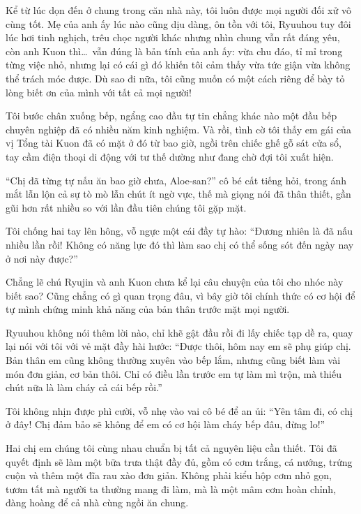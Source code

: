 \documentclass[../main.tex]{subfiles}
\begin{document}
Kể từ lúc dọn đến ở chung trong căn nhà này, tôi luôn được mọi người đối xử vô cùng tốt. Mẹ của anh ấy lúc nào cũng dịu dàng, ôn tồn với tôi, Ryuuhou tuy đôi lúc hơi tinh nghịch, trêu chọc người khác nhưng nhìn chung vẫn rất đáng yêu, còn anh Kuon thì\dots\ vẫn đúng là bản tính của anh ấy: vừa chu đáo, tỉ mỉ trong từng việc nhỏ, nhưng lại có cái gì đó khiến tôi cảm thấy vừa tức giận vừa không thể trách móc được. Dù sao đi nữa, tôi cũng muốn có một cách riêng để bày tỏ lòng biết ơn của mình với tất cả mọi người!

Tôi bước chân xuống bếp, ngẩng cao đầu tự tin chẳng khác nào một đầu bếp chuyên nghiệp đã có nhiều năm kinh nghiệm. Và rồi, tình cờ tôi thấy em gái của vị Tổng tài Kuon đã có mặt ở đó từ bao giờ, ngồi trên chiếc ghế gỗ sát cửa sổ, tay cầm điện thoại di động với tư thế dường như đang chờ đợi tôi xuất hiện.

``Chị đã từng tự nấu ăn bao giờ chưa, Aloe-san?'' cô bé cất tiếng hỏi, trong ánh mắt lẫn lộn cả sự tò mò lẫn chút ít ngờ vực, thế mà giọng nói đã thân thiết, gần gũi hơn rất nhiều so với lần đầu tiên chúng tôi gặp mặt.

Tôi chống hai tay lên hông, vỗ ngực một cái đầy tự hào: ``Đương nhiên là đã nấu nhiều lần rồi! Không có năng lực đó thì làm sao chị có thể sống sót đến ngày nay ở nơi này được?''

Chẳng lẽ chú Ryujin và anh Kuon chưa kể lại câu chuyện của tôi cho nhóc này biết sao? Cũng chẳng có gì quan trọng đâu, vì bây giờ tôi chính thức có cơ hội để tự mình chứng minh khả năng của bản thân trước mặt mọi người.

Ryuuhou không nói thêm lời nào, chỉ khẽ gật đầu rồi đi lấy chiếc tạp dề ra, quay lại nói với tôi với vẻ mặt đầy hài hước: ``Được thôi, hôm nay em sẽ phụ giúp chị. Bản thân em cũng không thường xuyên vào bếp lắm, nhưng cũng biết làm vài món đơn giản, cơ bản thôi. Chỉ có điều lần trước em tự làm mì trộn, mà thiếu chút nữa là làm cháy cả cái bếp rồi.''

Tôi không nhịn được phì cười, vỗ nhẹ vào vai cô bé để an ủi: ``Yên tâm đi, có chị ở đây! Chị đảm bảo sẽ không để em có cơ hội làm cháy bếp đâu, đừng lo!''

\ct

Hai chị em chúng tôi cùng nhau chuẩn bị tất cả nguyên liệu cần thiết. Tôi đã quyết định sẽ làm một bữa trưa thật đầy đủ, gồm có cơm trắng, cá nướng, trứng cuộn và thêm một đĩa rau xào đơn giản. Không phải kiểu hộp cơm nhỏ gọn, tươm tất mà người ta thường mang đi làm, mà là một mâm cơm hoàn chỉnh, đàng hoàng để cả nhà cùng ngồi ăn chung.
\end{document}
